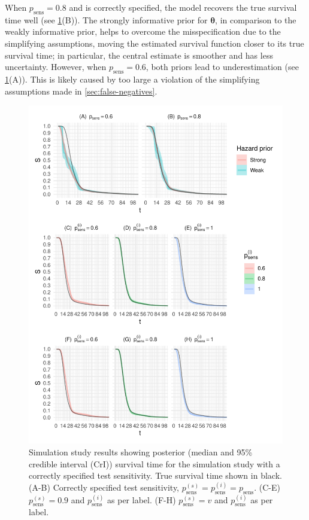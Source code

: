 \documentclass[referee,useAMS,usenatbib]{biom}
\renewcommand{\vec}[1]{\bm{#1}}
\newcommand{\psens}{p_\text{sens}}
\newcommand{\psenss}{p_\text{sens}^{(s)}}
\newcommand{\psensi}{p_\text{sens}^{(i)}}
\begin{document}
When $\psens = 0.8$ and is correctly specified, the model recovers the true survival time well (see \cref{imperf-test:fig:simulation-results}(B)).
The strongly informative prior for $\vec\theta$, in comparison to the weakly informative prior, helps to overcome the misspecification due to the simplifying assumptions, moving the estimated survival function closer to its true survival time; in particular, the central estimate is smoother and has less uncertainty.
However, when $\psens = 0.6$, both priors lead to underestimation (see \cref{imperf-test:fig:simulation-results}(A)).
This is likely caused by too large a violation of the simplifying assumptions made in \cref{sec:false-negatives}.
\begin{figure}
  \includegraphics{figures/output/sim-results}
  \caption[Simulation study results]{%
    Simulation study results showing posterior (median and 95\% credible interval (CrI)) survival time for the simulation study with a correctly specified test sensitivity.
    True survival time shown in black.
    (A-B) Correctly specified test sensitivity, $\psenss = \psensi = \psens$.
    (C-E) $\psenss = 0.9$ and $\psensi$ as per label.
    (F-H) $\psenss = v$ and $\psensi$ as per label.
  }
  \label{imperf-test:fig:simulation-results}
\end{figure}
\end{document}
